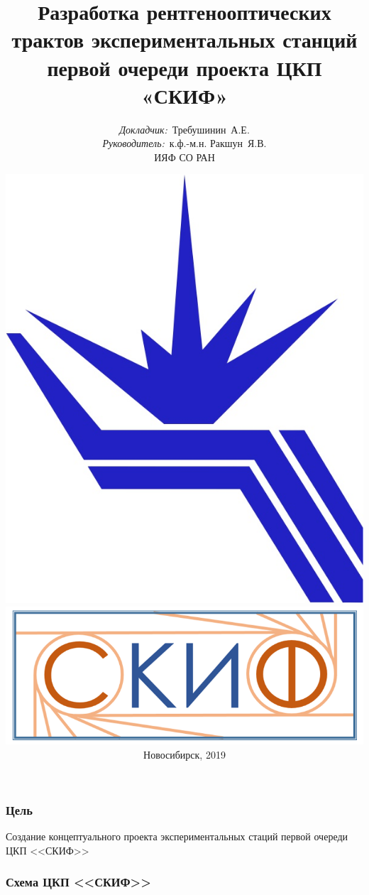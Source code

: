 \documentclass[14pt, hyperref = {colorlinks}]{beamer}
\title{\small{Разработка рентгенооптических трактов экспериментальных станций первой очереди проекта ЦКП «СКИФ»}}
\author{\small{%
		\emph{Докладчик:}~Требушинин~А.Е.\\%
		\emph{Руководитель:}~к.ф.-м.н. Ракшун~Я.В.}\\%
	\vspace{30pt}%
  	ИЯФ СО РАН
	\vspace{-15pt}%
}
\date{\includegraphics[width=0.1\linewidth]{pic/logo.jpg} \hspace{20pt}
	\includegraphics[width=0.2\linewidth]{pic/SKIFlogo.png}\\
	
	\vspace{5pt}%
	\small{Новосибирск, 2019}}
\begin{document}
\maketitle

\small
\begin{frame}
\frametitle{Цель}\label{t1}
\begin{center}
	\large{Создание концептуального проекта экспериментальных стаций первой очереди ЦКП <<СКИФ>>}
\end{center}
\end{frame}

\small
\begin{frame}
\frametitle{Схема ЦКП <<СКИФ>>}\label{t1}
\vspace{-10pt}
\begin{figure}[h]
\end{figure}
\end{frame}
\end{document}
